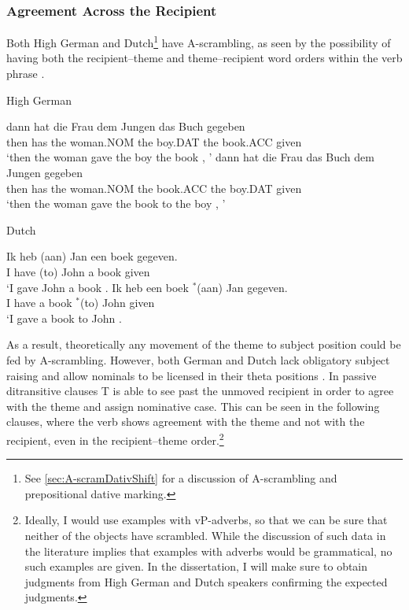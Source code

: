 \subsubsection{Agreement Across the Recipient}
Both High German and Dutch\footnote{See \autoref{sec:A-scramDativShift} for a discussion of A-scrambling and prepositional dative marking.} have A-scrambling, as seen by the possibility of having both the recipient--theme and theme--recipient word orders within the verb phrase \citep{McGinnis.1998}. 
\begin{exe}
\ex High German
\begin{xlist}
\ex \gll  dann hat die Frau dem Jungen das Buch gegeben\\
then has the woman.NOM the boy.DAT the book.ACC given \\
`then the woman gave the boy the book \citep[ex 1a]{Czepluch.1990}, \citep[20a]{Choi.1996}'
\ex \gll dann hat die Frau das Buch dem Jungen gegeben\\
then has the woman.NOM the book.ACC the boy.DAT given\\
`then the woman gave the book to the boy \citep[ex 1b]{Czepluch.1990}, \citep[20b]{Choi.1996}'
\end{xlist}
\ex Dutch
\begin{xlist}
\ex \gll Ik heb (aan) Jan een boek gegeven.\\
I have (to) John a book given\\
\trans `I gave John a book \citep[ex. 1a]{vanBelle.1996b}.
\ex \gll Ik heb een boek $^{*}$(aan) Jan gegeven.\\
I have a book $^{*}$(to) John given\\
\trans `I gave a book to John \citep[ex. 1a]{vanBelle.1996b}.
\end{xlist}
\end{exe}

As a result, theoretically any movement of the theme to subject position could be fed by A-scrambling. However, both German and Dutch lack obligatory subject raising and allow nominals to be licensed in their theta positions \citep{DenDikken.1995}. In passive ditransitive clauses T is able to see past the unmoved recipient in order to agree with the theme and assign nominative case. This can be seen in the following clauses, where the verb shows agreement with the theme and not with the recipient, even in the recipient--theme order.\footnote{Ideally, I would use examples with vP-adverbs, so that we can be sure that neither of the objects have scrambled. While the discussion of such data in the literature implies that examples with adverbs would be grammatical, no such examples are given. In the dissertation, I will make sure to obtain judgments from High German and Dutch speakers confirming the expected judgments.}

